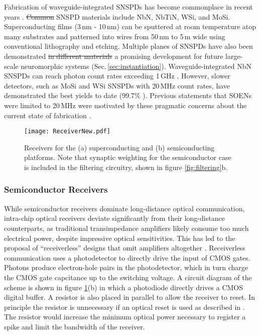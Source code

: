 \documentclass[twocolumn]{article}
\begin{document}
Fabrication of waveguide-integrated SNSPDs has become commonplace in recent years \cite{spga2011,pesc2012,akhlaghi2015waveguide,feka2015,saga2015,shbu2017b,ferrari2018waveguide,buta2020}. \sout{Common} SNSPD materials include NbN, NbTiN, WSi, and MoSi. Superconducting films (3\,nm - 10\,nm) can be sputtered at room temperature atop many substrates and patterned into wires from 50\,nm to 5\,\textmu m wide using conventional lithography and etching. Multiple planes of SNSPDs have also been demonstrated \sout{in different materials} \cite{vema2012} \textemdash a promising development for future large-scale neuromorphic systems (Sec.\,\ref{sec:instantiation}). Waveguide-integrated NbN SNSPDs can reach photon count rates exceeding 1\,GHz \cite{rosenberg2013high,vetter2016cavity}. However, slower detectors, such as MoSi and WSi SNSPDs with 20\,MHz count rates, have demonstrated the best yields to date (99.7\% \cite{wove2019}). Previous statements that SOENs were limited to 20\,MHz were motivated by these pragmatic concerns about the current state of fabrication \textcolor{ForestGreen}{\cite{shainline2019superconducting}}.

\begin{figure}[!h]
    \centering
    \texttt{[image: ReceiverNew.pdf]}
    \caption{Receivers for the (a) superconducting and (b) semiconducting platforms. Note that synaptic weighting for the semiconductor case is included in the filtering circuitry, shown in figure \ref{fig:filtering}b.}
    \label{fig:sup_synapse}
\end{figure}

\subsubsection{Semiconductor Receivers}
While semiconductor receivers dominate long-distance optical communication, intra-chip optical receivers deviate significantly from their long-distance counterparts, as traditional transimpedance amplifiers likely consume too much electrical power, despite impressive optical sensitivities. This has led to the proposal of ``receiverless'' designs that omit amplifiers altogether \cite{miller2017attojoule}. Receiverless communication uses a photodetector to directly drive the input of CMOS gates. Photons produce electron-hole pairs in the photodetector, which in turn charge the CMOS gate capcitance up to the switching voltage. A circuit diagram of the scheme is shown in figure \ref{fig:sup_synapse}(b) in which a photodiode directly drives a CMOS digital buffer. A resistor is also placed in parallel to allow the receiver to reset. In principle the resistor is unnecessary if an optical reset is used as described in \cite{debaes2003receiver}. The resistor would increase the minimum optical power necessary to register a spike and limit the bandwidth of the receiver. 
\end{document}
